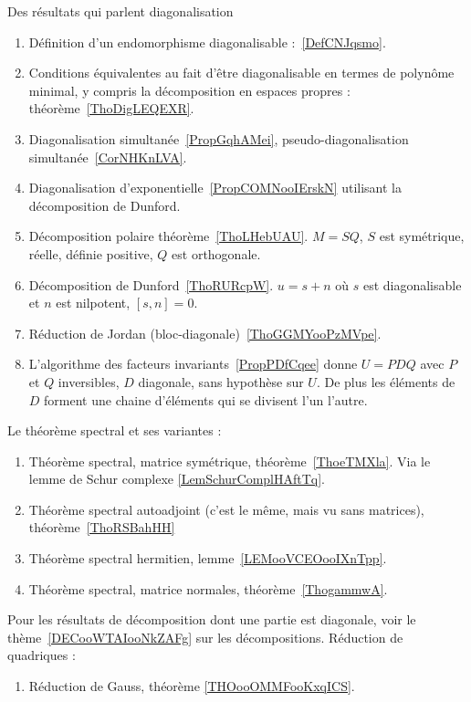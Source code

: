 
Des résultats qui parlent diagonalisation
\begin{enumerate}
	\item
	      Définition d'un endomorphisme diagonalisable :~\ref{DefCNJqsmo}.
	\item
	      Conditions équivalentes au fait d'être diagonalisable en termes de polynôme minimal, y compris la décomposition en espaces propres : théorème~\ref{ThoDigLEQEXR}.
	\item
	      Diagonalisation simultanée~\ref{PropGqhAMei}, pseudo-diagonalisation simultanée~\ref{CorNHKnLVA}.
	\item
	      Diagonalisation d'exponentielle~\ref{PropCOMNooIErskN} utilisant la décomposition de Dunford.
	\item
	      Décomposition polaire théorème~\ref{ThoLHebUAU}. \( M=SQ\), \( S\) est symétrique, réelle, définie positive, \( Q\) est orthogonale.
	\item
	      Décomposition de Dunford~\ref{ThoRURcpW}. \( u=s+n\) où \( s\) est diagonalisable et \( n\) est nilpotent, \( [s,n]=0\).
	\item
	      Réduction de Jordan (bloc-diagonale)~\ref{ThoGGMYooPzMVpe}.
	\item
	      L'algorithme des facteurs invariants~\ref{PropPDfCqee} donne \( U=PDQ\) avec \( P\) et \( Q\) inversibles, \( D\) diagonale, sans hypothèse sur \( U\). De plus les éléments de \( D\) forment une chaine d'éléments qui se divisent l'un l'autre.
\end{enumerate}
Le théorème spectral et ses variantes :
\begin{enumerate}
	\item
	      Théorème spectral, matrice symétrique, théorème~\ref{ThoeTMXla}. Via le lemme de Schur complexe \ref{LemSchurComplHAftTq}.
	\item
	      Théorème spectral autoadjoint (c'est le même, mais vu sans matrices), théorème~\ref{ThoRSBahHH}
	\item
	      Théorème spectral hermitien, lemme~\ref{LEMooVCEOooIXnTpp}.
	\item
	      Théorème spectral, matrice normales, théorème~\ref{ThogammwA}.
\end{enumerate}
Pour les résultats de décomposition dont une partie est diagonale, voir le thème~\ref{DECooWTAIooNkZAFg} sur les décompositions.
Réduction de quadriques :
\begin{enumerate}
	\item
	      Réduction de Gauss, théorème \ref{THOooOMMFooKxqICS}.
\end{enumerate}
